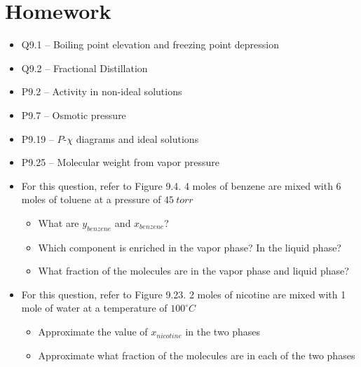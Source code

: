 \documentclass[12pt, openany, letterpaper]{memoir}
\begin{document}
\section*{Homework}
\begin{itemize}
	\item Q9.1 -- Boiling point elevation and freezing point depression
	\item Q9.2 -- Fractional Distillation
	\item P9.2 -- Activity in non-ideal solutions
	\item P9.7 -- Osmotic pressure
	\item P9.19 -- $P$-$\chi$ diagrams and ideal solutions
	\item P9.25 -- Molecular weight from vapor pressure
	\item For this question, refer to Figure 9.4. 4 moles of benzene are mixed with 6 moles of toluene at a pressure of $45~torr$
	\begin{itemize}
		\item What are $y_{benzene}$ and $x_{benzene}$?
		\item Which component is enriched in the vapor phase? In the liquid phase?
		\item What fraction of the molecules are in the vapor phase and liquid phase?
	\end{itemize}
	\item For this question, refer to Figure 9.23. 2 moles of nicotine are mixed with 1 mole of water at a temperature of $100^\circ C$
	\begin{itemize}
		\item Approximate the value of $x_{nicotine}$ in the two phases
		\item Approximate what fraction of the molecules are in each of the two phases
	\end{itemize}
\end{itemize}
\end{document}
